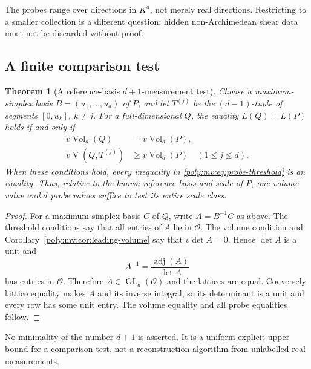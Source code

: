 \documentclass[11pt,a4paper]{article}
\numberwithin{equation}{section}
\newtheorem{theorem}{Theorem}[section]
\theoremstyle{plain}
\newcommand{\OO}{\mathcal O}
\newcommand{\Vol}{\operatorname{Vol}}
\newcommand{\MV}{\operatorname{V}}
\newcommand{\GL}{\operatorname{GL}}
\begin{document}
The probes range over directions in $K^d$, not merely real directions.
Restricting to a smaller collection is a different question: hidden
non-Archimedean shear data must not be discarded without proof.

\subsection{A finite comparison test}
\begin{theorem}[A reference-basis $d+1$-measurement test]
\label{poly:mv:thm:finite-probes}
Choose a maximum-simplex basis $B=(u_1,\ldots,u_d)$ of $P$, and let
$T^{(j)}$ be the $(d-1)$-tuple of segments $[0,u_k]$, $k\ne j$.
For a full-dimensional $Q$, the equality $L(Q)=L(P)$ holds if and only if
\begin{align}
 v\Vol_d(Q)&=v\Vol_d(P),\label{poly:mv:eq:probe-volume}\\
 v\MV(Q,T^{(j)})&\ge v\Vol_d(P)
             \quad(1\le j\le d).\label{poly:mv:eq:probe-threshold}
\end{align}
When these conditions hold, every inequality in
\eqref{poly:mv:eq:probe-threshold} is an equality. Thus, relative to the known
reference basis and scale of $P$, one volume value and $d$ probe values
suffice to test its entire scale class.
\end{theorem}
\begin{proof}
For a maximum-simplex basis $C$ of $Q$, write $A=B^{-1}C$ as above.
The threshold conditions say that all entries of $A$ lie in $\OO$.
The volume condition and Corollary~\ref{poly:mv:cor:leading-volume} say that
$v\det A=0$. Hence $\det A$ is a unit and
\[
 A^{-1}=\frac{\operatorname{adj}(A)}{\det A}
\]
has entries in $\OO$. Therefore $A\in\GL_d(\OO)$ and the lattices are
equal. Conversely lattice equality makes $A$ and its inverse integral,
so its determinant is a unit and every row has some unit entry. The
volume equality and all probe equalities follow.
\end{proof}

No minimality of the number $d+1$ is asserted. It is a uniform explicit
upper bound for a comparison test, not a reconstruction algorithm from
unlabelled real measurements.
\end{document}
